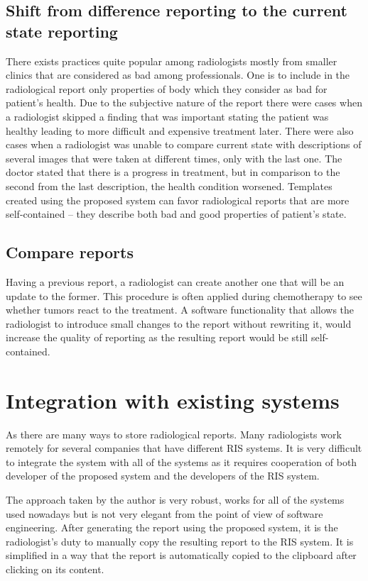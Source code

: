 \documentclass[12pt, twoside, openany]{report}
\theoremstyle{definition}
\begin{document}
\subsection{Shift from difference reporting to the current state reporting}
There exists practices quite popular among radiologists mostly from smaller clinics that are considered as bad among professionals. One is to include in the radiological report only properties of body which they consider as bad for patient's health. Due to the subjective nature of the report there were cases when a radiologist skipped a finding that was important stating the patient was healthy leading to more difficult and expensive treatment later.
There were also cases when a radiologist was unable to compare current state with descriptions of several images that were taken at different times, only with the last one. The doctor stated that there is a progress in treatment, but in comparison to the second from the last description, the health condition worsened. \cite{risk-management}
Templates created using the proposed system can favor radiological reports that are more self-contained -- they describe both bad and good properties of patient's state.

\subsection{Compare reports}
Having a previous report, a radiologist can create another one that will be an update to the former. This procedure is often applied during chemotherapy to see whether tumors react to the treatment. A software functionality that allows the radiologist to introduce small changes to the report without rewriting it, would increase the quality of reporting as the resulting report would be still self-contained.

\section{Integration with existing systems}
As there are many ways to store radiological reports. Many radiologists work remotely for several companies that have different RIS systems. It is very difficult to integrate the system with all of the systems as it requires cooperation of both developer of the proposed system and the developers of the RIS system. 

The approach taken by the author is very robust, works for all of the systems used nowadays but is not very elegant from the point of view of software engineering. 
After generating the report using the proposed system, it is the radiologist's duty to manually copy the resulting report to the RIS system. It is simplified in a way that the report is automatically copied to the clipboard after clicking on its content.
\end{document}
